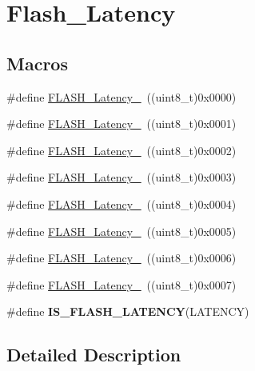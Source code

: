 \hypertarget{group___flash___latency}{\section{Flash\-\_\-\-Latency}
\label{group___flash___latency}
}
\subsection*{Macros}
\begin{DoxyCompactItemize}
\item 
\#define \hyperlink{group___flash___latency_ga09afe6e52b819cc074f6111ec42ac3c3}{F\-L\-A\-S\-H\-\_\-\-Latency\-\_}~((uint8\-\_\-t)0x0000)
\item 
\#define \hyperlink{group___flash___latency_ga6b7281665340fe8f7919bdfcfd06f8e6}{F\-L\-A\-S\-H\-\_\-\-Latency\-\_}~((uint8\-\_\-t)0x0001)
\item 
\#define \hyperlink{group___flash___latency_ga55173ebb5c978459ce18d5e2516e3e89}{F\-L\-A\-S\-H\-\_\-\-Latency\-\_}~((uint8\-\_\-t)0x0002)
\item 
\#define \hyperlink{group___flash___latency_ga13fbc5a6423848be5bf631dc437bbc3f}{F\-L\-A\-S\-H\-\_\-\-Latency\-\_}~((uint8\-\_\-t)0x0003)
\item 
\#define \hyperlink{group___flash___latency_ga74a5deaec2020e484ce576925ff7de16}{F\-L\-A\-S\-H\-\_\-\-Latency\-\_}~((uint8\-\_\-t)0x0004)
\item 
\#define \hyperlink{group___flash___latency_ga8e52670ad258b0a95c94b99b8d7eab27}{F\-L\-A\-S\-H\-\_\-\-Latency\-\_}~((uint8\-\_\-t)0x0005)
\item 
\#define \hyperlink{group___flash___latency_ga053dfbef3307536ff40a5ceb2576a4a3}{F\-L\-A\-S\-H\-\_\-\-Latency\-\_}~((uint8\-\_\-t)0x0006)
\item 
\#define \hyperlink{group___flash___latency_ga352a374f6ae41d2cae767ed95efc6ae5}{F\-L\-A\-S\-H\-\_\-\-Latency\-\_}~((uint8\-\_\-t)0x0007)
\item 
\#define {\bfseries I\-S\-\_\-\-F\-L\-A\-S\-H\-\_\-\-L\-A\-T\-E\-N\-C\-Y}(L\-A\-T\-E\-N\-C\-Y)
\end{DoxyCompactItemize}


\subsection{Detailed Description}


